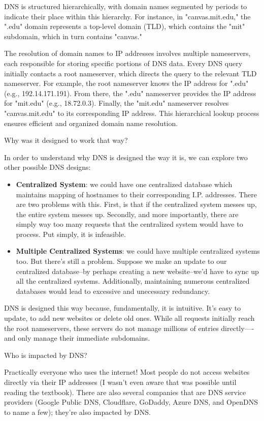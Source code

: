 \documentclass[a4paper]{article}
\begin{document}
\begin{Solution}
    DNS is structured hierarchically, with domain names segmented by periods to indicate their place within this hierarchy. For instance, in "canvas.mit.edu," the ".edu" domain represents a top-level domain (TLD), which contains the "mit" subdomain, which in turn contains "canvas."

    The resolution of domain names to IP addresses involves multiple nameservers, each responsible for storing specific portions of DNS data. Every DNS query initially contacts a root nameserver, which directs the query to the relevant TLD nameserver. For example, the root nameserver knows the IP address for ".edu" (e.g., 192.14.171.191). From there, the ".edu" nameserver provides the IP address for "mit.edu" (e.g., 18.72.0.3). Finally, the "mit.edu" nameserver resolves "canvas.mit.edu" to its corresponding IP address. This hierarchical lookup process ensures efficient and organized domain name resolution.
\end{Solution}
\begin{Exercise}
Why was it designed to work that way?
\end{Exercise}
\begin{Solution}
	In order to understand why DNS is designed the way it is, we can explore two other possible DNS designs:
	\begin{itemize}
		\item \textbf{Centralized System}: we could have one centralized database which maintains mapping of hostnames to their corresponding I.P. addresses. There are two problems with this. First, is that if the centralized system messes up, the entire system messes up. Secondly, and more importantly, there are simply way too many requests that the centralized system would have to process. Put simply, it is infeasible.
		\item \textbf{Multiple Centralized Systems}: we could have multiple centralized systems too. But there's still a problem. Suppose we make an update to our centralized database--by perhaps creating a new website--we'd have to sync up all the centralized systems. Additionally, maintaining numerous centralized databases would lead to excessive and unecessary redundancy.
	\end{itemize}
	DNS is designed this way because, fundamentally, it is intuitive. It's easy to update, to add new websites or delete old ones. While all requests initially reach the root nameservers, these servers do not manage millions of entries directly—-and only manage their immediate subdomains.
\end{Solution}
\begin{Exercise}
	Who is impacted by DNS?
\end{Exercise}
\begin{Solution}
	Practically everyone who uses the internet! Most people do not access websites directly via their IP addresses (I wasn’t even aware that was possible until reading the textbook). There are also several companies that are DNS service providers (Google Public DNS, Cloudflare, GoDaddy, Azure DNS, and OpenDNS to name a few); they're also impacted by DNS. 
\end{Solution}
\end{document}
